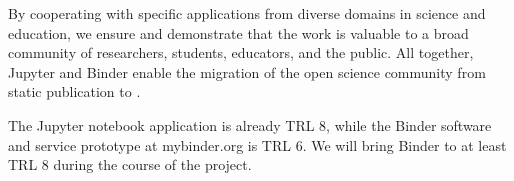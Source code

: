 By cooperating with specific applications from diverse domains in science and education,
we ensure and demonstrate that the work is valuable to a broad community of researchers, students, educators, and the public.
All together, Jupyter and Binder enable the migration of the open
science community from static publication to .

The Jupyter notebook application is already TRL 8,
while the Binder software and service prototype at mybinder.org is TRL 6.
We will bring Binder to at least TRL 8 during the course of the project.



